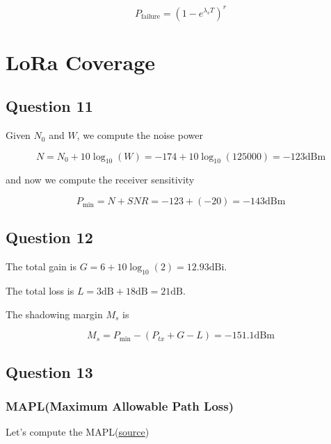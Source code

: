 \documentclass[]{article}
\begin{document}
	\begin{equation}
		P_{\text{failure}} = \left(1 - e^{\lambda_v T}\right)^r
	\end{equation}
	
	\section{LoRa Coverage}
	
	\subsection*{Question 11}
	
	Given $N_0$ and $W$, we compute the noise power
	
	\begin{equation}
		N = N_0 + 10\log_{10}(W) = -174 + 10\log_{10}(125000) = -123\text{dBm}
	\end{equation}
	
	and now we compute the receiver sensitivity
	
	\begin{equation}
		P_{\text{min}} = N + SNR = -123 + (-20) = -143\text{dBm}
	\end{equation}
	
	\subsection*{Question 12}
	
	The total gain is $G = 6 + 10\log_{10}(2) = 12.93\text{dBi}$.
	
	The total loss is $L = 3\text{dB} + 18\text{dB} = 21\text{dB}$.
	
	The shadowing margin $M_s$ is 
	
	\begin{equation}
		M_s = P_{\text{min}} - (P_{tx} + G - L) = -151.1\text{dBm}
	\end{equation}
	
	\subsection*{Question 13}
	
	\subsubsection*{MAPL(Maximum Allowable Path Loss)}
	
	Let's compute the MAPL(\href{https://wireless-systems.ece.gatech.edu/6604/2019-lectures/week2.pdf}{source})
	
\end{document}
